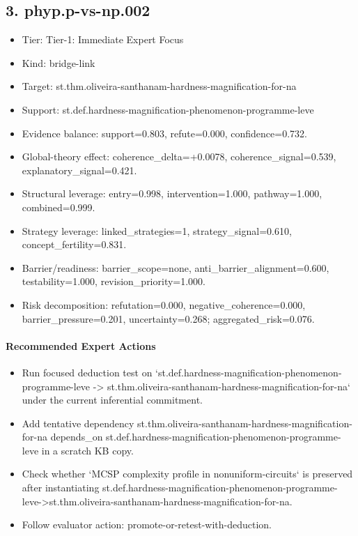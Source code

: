 \documentclass[11pt]{article}
\begin{document}
\subsection*{3. phyp.p-vs-np.002}
\begin{itemize}
\item Tier: Tier-1: Immediate Expert Focus
\item Kind: bridge-link
\item Target: st.thm.oliveira-santhanam-hardness-magnification-for-na
\item Support: st.def.hardness-magnification-phenomenon-programme-leve
\item Evidence balance: support=0.803, refute=0.000, confidence=0.732.
\item Global-theory effect: coherence\_delta=+0.0078, coherence\_signal=0.539, explanatory\_signal=0.421.
\item Structural leverage: entry=0.998, intervention=1.000, pathway=1.000, combined=0.999.
\item Strategy leverage: linked\_strategies=1, strategy\_signal=0.610, concept\_fertility=0.831.
\item Barrier/readiness: barrier\_scope=none, anti\_barrier\_alignment=0.600, testability=1.000, revision\_priority=1.000.
\item Risk decomposition: refutation=0.000, negative\_coherence=0.000, barrier\_pressure=0.201, uncertainty=0.268; aggregated\_risk=0.076.
\end{itemize}
\paragraph{Recommended Expert Actions}
\begin{itemize}
\item Run focused deduction test on `st.def.hardness-magnification-phenomenon-programme-leve -> st.thm.oliveira-santhanam-hardness-magnification-for-na` under the current inferential commitment.
\item Add tentative dependency st.thm.oliveira-santhanam-hardness-magnification-for-na depends\_on st.def.hardness-magnification-phenomenon-programme-leve in a scratch KB copy.
\item Check whether `MCSP complexity profile in nonuniform-circuits` is preserved after instantiating st.def.hardness-magnification-phenomenon-programme-leve->st.thm.oliveira-santhanam-hardness-magnification-for-na.
\item Follow evaluator action: promote-or-retest-with-deduction.
\end{itemize}
\end{document}
